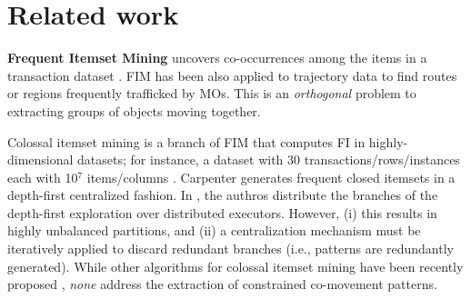 \documentclass[
]{ceurart}
\begin{document}
\section{Related work}\label{sec:related}

\textbf{Frequent Itemset Mining} uncovers co-occurrences among the items in a transaction dataset \citep{DBLP:conf/vldb/AgrawalS94}. 
FIM has been also applied to trajectory data to find routes \citep{DBLP:conf/ideal/QiuP16,DBLP:journals/access/FuTXZ17} or regions \citep{zheng2018spatial} frequently trafficked by MOs.
This is an \textit{orthogonal} problem to extracting groups of objects moving together.

Colossal itemset mining is a branch of FIM that computes FI in highly-dimensional datasets; for instance, a dataset with 30 transactions/rows/instances each with 10$^7$ items/columns \citep{DBLP:journals/bdr/ApilettiBCGPM17}.
Carpenter \citep{DBLP:conf/kdd/PanCTYZ03} generates frequent closed itemsets in a depth-first centralized fashion.
In \cite{DBLP:journals/bdr/ApilettiBCGPM17}, the authros distribute the branches of the depth-first exploration over distributed executors. 
However, (i) this results in highly unbalanced partitions,
and (ii) a centralization mechanism must be iteratively applied to discard redundant branches (i.e., patterns are redundantly generated).
While other algorithms for colossal itemset mining have been recently proposed \citep{DBLP:conf/kdd/PanCTYZ03,DBLP:journals/kbs/ZakiZ18,DBLP:journals/isci/VanahalliP19}, \textit{none} address the extraction of constrained co-movement patterns.
\end{document}
